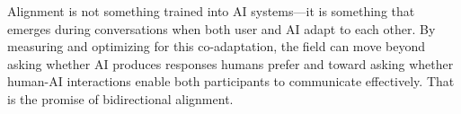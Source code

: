 Alignment is not something trained into AI systems---it is something that emerges during conversations when both user and AI adapt to each other. By measuring and optimizing for this co-adaptation, the field can move beyond asking whether AI produces responses humans prefer and toward asking whether human-AI interactions enable both participants to communicate effectively. That is the promise of bidirectional alignment.
